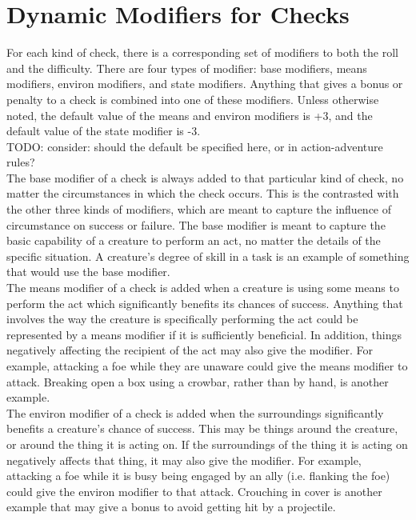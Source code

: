 \documentclass[letterpaper,titlepage,openany,twocolumn]{book}
\begin{document}
\section{Dynamic Modifiers for Checks}
For each kind of check, there is a corresponding set of modifiers to both the roll and the difficulty. There are four types of modifier: base modifiers, means modifiers, environ modifiers, and state modifiers. Anything that gives a bonus or penalty to a check is combined into one of these modifiers. Unless otherwise noted, the default value of the means and environ modifiers is +3, and the default value of the state modifier is -3.\\
TODO: consider: should the default be specified here, or in action-adventure rules?\\

The base modifier of a check is always added to that particular kind of check, no matter the circumstances in which the check occurs. This is the contrasted with the other three kinds of modifiers, which are meant to capture the influence of circumstance on success or failure. The base modifier is meant to capture the basic capability of a creature to perform an act, no matter the details of the specific situation. A creature’s degree of skill in a task is an example of something that would use the base modifier.\\

The means modifier of a check is added when a creature is using some means to perform the act which significantly benefits its chances of success. Anything that involves the way the creature is specifically performing the act could be represented by a means modifier if it is sufficiently beneficial. In addition, things negatively affecting the recipient of the act may also give the modifier. For example, attacking a foe while they are unaware could give the means modifier to attack. Breaking open a box using a crowbar, rather than by hand, is another example.\\

The environ modifier of a check is added when the surroundings significantly benefits a creature’s chance of success. This may be things around the creature, or around the thing it is acting on. If the surroundings of the thing it is acting on negatively affects that thing, it may also give the modifier. For example, attacking a foe while it is busy being engaged by an ally (i.e. flanking the foe) could give the environ modifier to that attack. Crouching in cover is another example that may give a bonus to avoid getting hit by a projectile.\\
\end{document}
